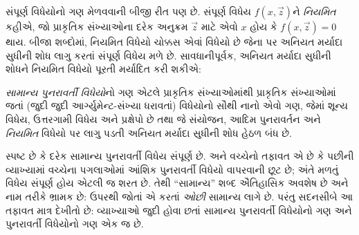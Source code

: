 \documentclass[../../../include/open-logic-section]{subfiles}
\begin{document}

સંપૂર્ણ વિધેયોનો ગણ મેળવવાની બીજી રીત પણ છે. સંપૂર્ણ વિધેય
$f(x,\vec z)$ને \emph{નિયમિત} કહીએ, જો પ્રાકૃતિક સંખ્યાઓના દરેક
અનુક્રમ $\vec z$ માટે એવો $x$ હોય કે $f(x,\vec z) = 0$ થાય.
બીજા શબ્દોમાં, નિયમિત વિધેયો ચોક્કસ એવાં વિધેયો છે જેના પર
અનિયત મર્યાદા સુધીની શોધ લાગુ કરતાં સંપૂર્ણ વિધેય મળે છે.
સાવધાનીપૂર્વક, અનિયત મર્યાદા સુધીની શોધને નિયમિત વિધેયો પૂરતી
મર્યાદિત કરી શકીએ:

\begin{defn}
\emph{સામાન્ય પુનરાવર્તી વિધેયો}નો ગણ એટલે પ્રાકૃતિક
સંખ્યાઓમાંથી પ્રાકૃતિક સંખ્યાઓમાં જતાં (જુદી જુદી
આર્ગ્યુમેન્ટ-સંખ્યા ધરાવતાં) વિધેયોનો સૌથી નાનો એવો ગણ, જેમાં
શૂન્ય વિધેય, ઉત્તરગામી વિધેય અને પ્રક્ષેપો છે તથા જે સંયોજન,
આદિમ પુનરાવર્તન અને \emph{નિયમિત} વિધેયો પર લાગુ પડતી અનિયત
મર્યાદા સુધીની શોધ હેઠળ બંધ છે.
\end{defn}

સ્પષ્ટ છે કે દરેક સામાન્ય પુનરાવર્તી વિધેય સંપૂર્ણ છે.
 અને
 વચ્ચેનો તફાવત એ છે કે પછીની
વ્યાખ્યામાં વચ્ચેના પગલાઓમાં આંશિક પુનરાવર્તી વિધેયો વાપરવાની
છૂટ છે; અંતે મળતું વિધેય સંપૂર્ણ હોય એટલી જ શરત છે. તેથી
``સામાન્ય'' શબ્દ ઐતિહાસિક અવશેષ છે અને નામ તરીકે ભ્રામક છે:
ઉપરથી જોતાં  એ
 કરતાં \emph{ઓછી} સામાન્ય લાગે છે.
પરંતુ સદનસીબે આ તફાવત માત્ર દેખીતો છે: વ્યાખ્યાઓ જુદી હોવા
છતાં સામાન્ય પુનરાવર્તી વિધેયોનો ગણ અને પુનરાવર્તી વિધેયોનો
ગણ એક જ છે.
\end{document}
